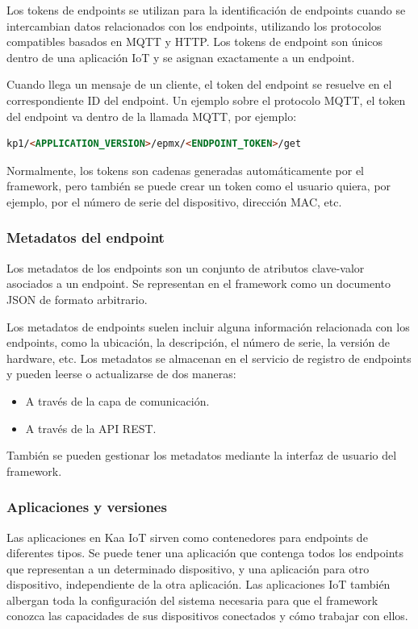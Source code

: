 {Los tokens de endpoints se utilizan para la identificación de endpoints cuando se intercambian datos relacionados con los endpoints, utilizando los protocolos compatibles basados en MQTT y HTTP. Los tokens de endpoint son únicos dentro de una aplicación IoT y se asignan exactamente a un endpoint.

Cuando llega un mensaje de un cliente, el token del endpoint se resuelve en el correspondiente ID del endpoint. Un ejemplo sobre el protocolo MQTT, el token del endpoint va dentro de la llamada MQTT, por ejemplo:

\begin{lstlisting}[language=HTML]
kp1/<APPLICATION_VERSION>/epmx/<ENDPOINT_TOKEN>/get
\end{lstlisting}

Normalmente, los tokens son cadenas generadas automáticamente por el framework, pero también se puede crear un token como el usuario quiera, por ejemplo, por el número de serie del dispositivo, dirección MAC, etc.

\subsubsection{Metadatos del endpoint}

Los metadatos de los endpoints son un conjunto de atributos clave-valor asociados a un endpoint. Se representan en el framework como un documento JSON de formato arbitrario.

Los metadatos de endpoints suelen incluir alguna información relacionada con los endpoints, como la ubicación, la descripción, el número de serie, la versión de hardware, etc. Los metadatos se almacenan en el servicio de registro de endpoints y pueden leerse o actualizarse de dos maneras:

\begin{itemize}
    \item A través de la capa de comunicación.
    \item A través de la API REST.
\end{itemize}

También se pueden gestionar los metadatos mediante la interfaz de usuario del framework.

\subsubsection{Aplicaciones y versiones}

Las aplicaciones en Kaa IoT sirven como contenedores para endpoints de diferentes tipos. Se puede tener una aplicación que contenga todos los endpoints que representan a un determinado dispositivo, y una aplicación para otro dispositivo, independiente de la otra aplicación. Las aplicaciones IoT también albergan toda la configuración del sistema necesaria para que el framework conozca las capacidades de sus dispositivos conectados y cómo trabajar con ellos.

}
